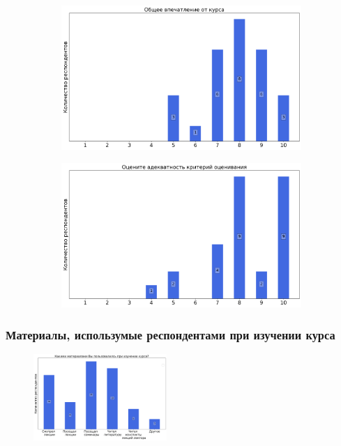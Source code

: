 		\begin{figure}[H]
			\centering
			\begin{subfigure}[b]{0.45\textwidth}
				\centering
				\includegraphics[width=\textwidth]{images/2 course/Общая физика - электричество и магнетизм/general-0.png}
			\end{subfigure}
			\begin{subfigure}[b]{0.45\textwidth}
				\centering
				\includegraphics[width=\textwidth]{images/2 course/Общая физика - электричество и магнетизм/general-1.png}
			\end{subfigure}	
		\end{figure}

	\subsubsection{Материалы, использумые респондентами при изучении курса}

		\begin{figure}[H]
			\centering
			\includegraphics[width = 0.45\textwidth]{images/2 course/Общая физика - электричество и магнетизм/materials.png}
		\end{figure}


